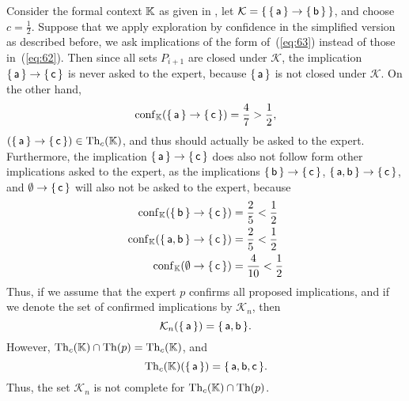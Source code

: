 \begin{Example}
  Consider the formal context ${\mathbb{K}}$ as given in
  , let $\mathcal{K} = {\{\,
    {\{\,\mathsf{a}\,\}} \to {\ensuremath{\{\,\mathsf{b}\,\}}} \,\}}$, and choose $c = \frac 1 2$.  Suppose that we
  apply exploration by confidence in the simplified version as described before, \ie we
  ask implications of the form of~(\ref{eq:63}) instead of those in~(\ref{eq:62}).  Then
  since all sets $P_{i+1}$ are closed under $\mathcal{K}$, the implication ${\{\,
    \mathsf{a} \,\}} \to {\ensuremath{\{\, \mathsf{c} \,\}}}$ is never asked to the expert, because ${\{\,
    \mathsf{a} \,\}}$ is not closed under $\mathcal{K}$.  On the other hand,
  \begin{equation*}
    \operatorname{conf}_{{\mathbb{K}}} ( {\{\, \mathsf{a} \,\}} \to {\ensuremath{\{\, \mathsf{c} \,\}}}) = \frac 4 7 > \frac 1 2,
  \end{equation*}
  \ie $({\{\, \mathsf{a} \,\}} \to {\ensuremath{\{\, \mathsf{c} \,\}}}) \in \operatorname{Th}_{c}({\mathbb{K}})$, and thus should
  actually be asked to the expert.  Furthermore, the implication ${\{\, \mathsf{a} \,\}} \to
  {\ensuremath{\{\, \mathsf{c} \,\}}}$ does also not follow form other implications asked to the expert, as
  the implications ${\{\, \mathsf{b} \,\}} \to {\ensuremath{\{\, \mathsf{c} \,\}}}$, ${\{\, \mathsf{a},
    \mathsf{b} \,\}} \to {\ensuremath{\{\, \mathsf{c} \,\}}}$, and $\emptyset \to {\ensuremath{\{\, \mathsf{c} \,\}}}$ will also
  not be asked to the expert, because
  \begin{align*}
    \operatorname{conf}_{{\mathbb{K}}} ({\{\, \mathsf{b} \,\}} \to {\ensuremath{\{\, \mathsf{c} \,\}}}) &= \frac 2 5 < \frac 1 2\\
    \operatorname{conf}_{{\mathbb{K}}} ({\{\, \mathsf{a}, \mathsf{b} \,\}} \to {\ensuremath{\{\, \mathsf{c} \,\}}}) &= \frac 2 5 <
    \frac 1 2\\
    \operatorname{conf}_{{\mathbb{K}}}( \emptyset \to {\ensuremath{\{\, \mathsf{c} \,\}}} ) &= \frac 4 {10} < \frac 1 2
  \end{align*}
  Thus, if we assume that the expert $p$ confirms all proposed implications, and if we
  denote the set of confirmed implications by $\mathcal{K}_{n}$, then
  \begin{equation*}
    \mathcal{K}_{n}({\{\, \mathsf{a} \,\}}) = {\{\, \mathsf{a}, \mathsf{b} \,\}}.
  \end{equation*}
  However, $\operatorname{Th}_{c}({\mathbb{K}}) \cap \operatorname{Th}(p) = \operatorname{Th}_{c}({\mathbb{K}})$, and
  \begin{equation*}
    \operatorname{Th}_{c}({\mathbb{K}})({\{\, \mathsf{a} \,\}}) = {\{\, \mathsf{a}, \mathsf{b}, \mathsf{c} \,\}}.
  \end{equation*}
  Thus, the set $\mathcal{K}_{n}$ is not complete for $\operatorname{Th}_{c}({\mathbb{K}}) \cap \operatorname{Th}(p)$.
\end{Example}

